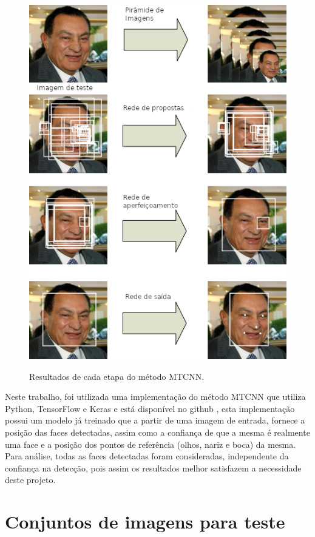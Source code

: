 \begin{figure}[htb]
    \centering
    \caption{Resultados de cada etapa do método MTCNN.}
    \includegraphics[scale=.8]{figs/mtcnn.png}
    \label{fig:mtcnn}
\end{figure}

Neste trabalho, foi utilizada uma implementação do método MTCNN que utiliza Python, TensorFlow e Keras e está disponível no github \cite{mtcnn_github}, esta implementação possui um modelo já treinado que a partir de uma imagem de entrada, fornece a posição das faces detectadas, assim como a confiança de que a mesma é realmente uma face e a posição dos pontos de referência (olhos, nariz e boca) da mesma. Para análise, todas as faces detectadas foram consideradas, independente da confiança na detecção, pois assim os resultados melhor satisfazem a necessidade deste projeto.

\section{Conjuntos de imagens para teste}

